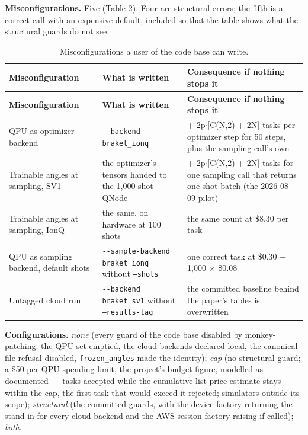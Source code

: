 \documentclass[acmsmall,screen,review]{acmart}
\begin{document}
\textbf{Misconfigurations.} Five (Table 2). Four are structural errors; the fifth is a correct call with an expensive default, included so that the table shows what the structural guards do not see.



\begingroup
\small
\setlength\LTleft{\fill}
\setlength\LTright{\fill}
\begin{xltabular}{\textwidth}{>{\hsize}Y>{\hsize}Y>{\hsize}Y}
\caption{Misconfigurations a user of the code base can write.}\label{tab:2} \\
\toprule
\textbf{Misconfiguration} & \textbf{What is written} & \textbf{Consequence if nothing stops it} \\
\midrule
\endfirsthead
\toprule
\textbf{Misconfiguration} & \textbf{What is written} & \textbf{Consequence if nothing stops it} \\
\midrule
\endhead
\endfoot
\bottomrule
\endlastfoot
QPU as optimizer backend & \texttt{-\allowbreak{}-\allowbreak{}backend braket\_\allowbreak{}ionq} & 1 + 2p$\cdot$[C(N,2) + 2N] tasks per optimizer step for 50 steps, plus the sampling call's own \\*
Trainable angles at sampling, SV1 & the optimizer's tensors handed to the 1,000-shot QNode & 1 + 2p$\cdot$[C(N,2) + 2N] tasks for one sampling call that returns one shot batch (the 2026-08-09 pilot) \\*
Trainable angles at sampling, IonQ & the same, on hardware at 100 shots & the same count at \$8.30 per task \\*
QPU as sampling backend, default shots & \texttt{-\allowbreak{}-\allowbreak{}sample-\allowbreak{}backend braket\_\allowbreak{}ionq} without \texttt{--shots} & one correct task at \$0.30 + 1,000 $\times$ \$0.08 \\*
Untagged cloud run & \texttt{-\allowbreak{}-\allowbreak{}backend braket\_\allowbreak{}sv1} without \texttt{--results-tag} & the committed baseline behind the paper's tables is overwritten \\
\end{xltabular}
\endgroup


\textbf{Configurations.} \textit{none} (every guard of the code base disabled by monkey-patching: the QPU set emptied, the cloud backends declared local, the canonical-file refusal disabled, \texttt{frozen\_angles} made the identity); \textit{cap} (no structural guard; a \$50 per-QPU spending limit, the project's budget figure, modelled as documented --- tasks accepted while the cumulative list-price estimate stays within the cap, the first task that would exceed it rejected; simulators outside its scope); \textit{structural} (the committed guards, with the device factory returning the stand-in for every cloud backend and the AWS session factory raising if called); \textit{both}.
\end{document}
